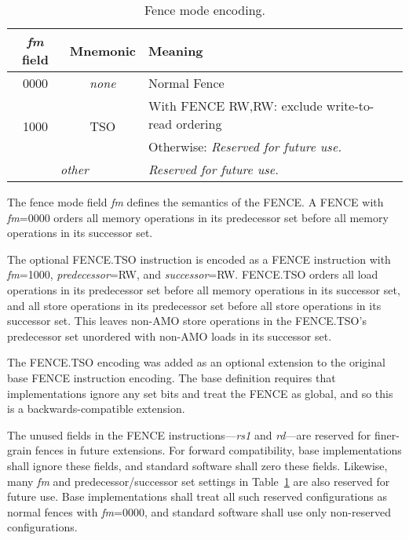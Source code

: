 \begin{table}[htp]
\begin{small}
\begin{center}
\begin{tabular}{|c|c|l|}
\hline
{\em fm} field & Mnemonic & Meaning \\
\hline
0000 & \em none & Normal Fence \\
\hline
\multirow{2}{*}{1000} & \multirow{2}{*}{TSO} & With FENCE RW,RW: exclude write-to-read ordering \\
                      &                      & Otherwise: \em Reserved for future use. \\
\hline
\multicolumn{2}{|c|}{\em other} & \em Reserved for future use. \\
\hline
\end{tabular}
\end{center}
\end{small}
\caption{Fence mode encoding.}
\label{fm}
\end{table}

The fence mode field {\em fm} defines the semantics of the FENCE.  A
FENCE with {\em fm}=0000 orders all memory operations in its
predecessor set before all memory operations in its successor set. 

The optional FENCE.TSO instruction is encoded as a FENCE instruction
with {\em fm}=1000, {\em predecessor}=RW, and {\em successor}=RW.
FENCE.TSO orders all load
operations in its predecessor set before all memory operations in its
successor set, and all store operations in its predecessor set before
all store operations in its successor set.  This leaves non-AMO store
operations in the FENCE.TSO's predecessor set unordered with non-AMO
loads in its successor set.

\begin{commentary}
  The FENCE.TSO encoding was added as an optional extension to the
  original base FENCE instruction encoding.  The base definition
  requires that implementations ignore any set bits and treat the
  FENCE as global, and so this is a backwards-compatible extension.
\end{commentary}

The unused fields in the FENCE instructions---{\em rs1} and {\em rd}---are
reserved for finer-grain fences in future extensions.  For forward
compatibility, base implementations shall ignore these fields, and standard
software shall zero these fields.  Likewise, many {\em fm} and
predecessor/successor set settings in Table~\ref{fm} are also reserved
for future use.  Base implementations shall treat all such reserved
configurations as normal fences with {\em fm}=0000, and standard
software shall use only non-reserved configurations.


